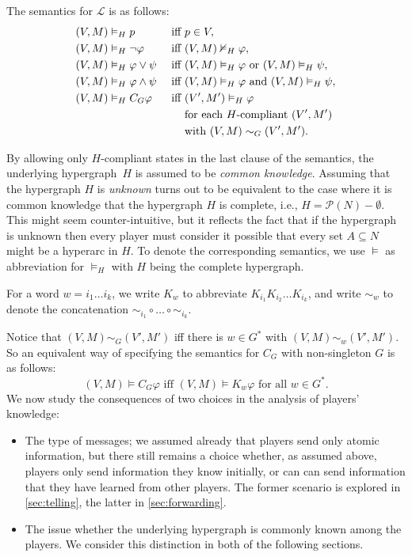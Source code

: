 \documentclass{article}
\newcounter{#1}
\newcommand{\state}[1][]{\ensuremath{(V#1,M#1)}\xspace}
\newcommand{\knows}[1]{\ensuremath{K_{#1}}\xspace}
\newcommand{\ck}[1]{\ensuremath{C_{#1}}\xspace}\newcommand{\Facts}{\mathit{Facts}}
\newcommand{\powerset}[1]{\ensuremath{\mathcal{P}(#1)}}
\renewcommand{\iff}{\text{ iff }}
\renewcommand{\enspace}{}
\begin{document}
The semantics for $\mathcal{L}$ is as follows:
\begin{align*}
  \state  &\vDash_H p                   && \iff p \in V, \\
  \state  &\vDash_H \neg \varphi            && \iff \state  \nvDash_H \varphi, \\
  \state  &\vDash_H \varphi \lor \psi       && \iff \state  \vDash_H \varphi\text{ or }\state  \vDash_H \psi, \\
  \state  &\vDash_H \varphi \land \psi      && \iff \state  \vDash_H \varphi\text{ and }\state  \vDash_H \psi, \\
  \state  &\vDash_H \ck G \varphi             && \iff
  \begin{aligned}[t]
    &\state['] \vDash_H \varphi\\
    &\text{for each $H$-compliant \state[']}\\
    &\text{with } \state \sim_{G} \state[']\enspace.
  \end{aligned}
\end{align*}


By allowing only $H$-compliant states in the last clause of the semantics,
the underlying hypergraph~$H$ is assumed to be \emph{common knowledge}.
Assuming that the hypergraph $H$ is \emph{unknown} turns out to be equivalent to 
the case where it is common knowledge that the hypergraph $H$ is complete,
i.e., $H=\powerset{N} - {\emptyset}$.
This might seem counter-intuitive, but it reflects the fact that if the
hypergraph is unknown then every player must consider it possible that
every set $A \subseteq N$ might be a hyperarc in $H$.
To denote the corresponding semantics,
we use $\vDash$ as abbreviation for  $\vDash_H$ with $H$ being the complete hypergraph.

For a word $w=i_1\ldots i_k$, we write $\knows w$ to abbreviate $\knows{i_1}\knows{i_2} \ldots \knows{i_k}$,
and write $\sim_w$ to denote the concatenation $\sim_{i_1} \circ \ldots \circ \sim_{i_k}$.

Notice that $\state \sim_G \state[']$ iff there is $w\in G^*$ with $\state \sim_w \state[']$.
So an equivalent way of specifying the semantics for $\ck G$ with non-singleton $G$ is as follows:
\begin{equation}
  \label{equ:K}\state \vDash \ck G \varphi\text{ iff }\state \vDash \knows w \varphi\text{ for all }w\in G^*\enspace.
  \tag{$\star$}
\end{equation}
We now study the consequences of two choices in the analysis of players' knowledge:
\begin{itemize}
\item The type of messages; we assumed already that players send only atomic information, but there still remains a choice whether, as assumed above, players only send information they know initially, or can can send information that they have learned from other players.  The former scenario is explored in \cref{sec:telling}, the latter in \cref{sec:forwarding}.
\item The issue whether the underlying hypergraph is commonly known among the players.
We consider this distinction in both of the following sections.
\end{itemize}
\end{document}
